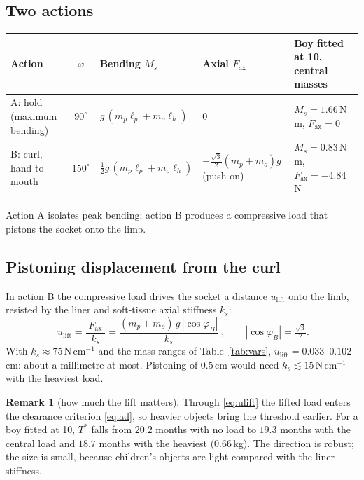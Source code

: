 \documentclass[11pt]{article}
\newcommand{\lift}{u_{\mathrm{lift}}}
\newcommand{\Fax}{F_{\mathrm{ax}}}
\theoremstyle{definition}
\newtheorem{remark}{Remark}
\begin{document}
\subsection{Two actions}
\begin{center}
\small
\renewcommand{\arraystretch}{1.3}
\begin{tabular}{@{}L{3.0cm}cL{3.2cm}L{3.2cm}L{4.4cm}@{}}
\toprule
Action & $\varphi$ & Bending $M_s$ & Axial $\Fax$ & Boy fitted at 10, central masses\\
\midrule
A: hold (maximum bending) & $90^\circ$ & $g\,(m_p\ell_p+m_o\ell_h)$ & $0$ & $M_s=1.66$\,N\,m, $\Fax=0$\\
B: curl, hand to mouth & $150^\circ$ & $\tfrac12 g\,(m_p\ell_p+m_o\ell_h)$ & $-\tfrac{\sqrt3}{2}(m_p+m_o)g$ (push-on) & $M_s=0.83$\,N\,m, $\Fax=-4.84$\,N\\
\bottomrule
\end{tabular}
\end{center}
Action A isolates peak bending; action B produces a compressive load that pistons the socket onto the limb.

\subsection{Pistoning displacement from the curl}
In action B the compressive load drives the socket a distance $\lift$ onto the limb, resisted by the liner and soft-tissue axial stiffness $k_s$:
\begin{equation}
\boxed{\;\lift=\frac{|\Fax|}{k_s}
=\frac{(m_p+m_o)\,g\,|\cos\varphi_B|}{k_s}\;},
\qquad
|\cos\varphi_B|=\tfrac{\sqrt3}{2}.
\label{eq:ulift}
\end{equation}
With $k_s\approx75$\,N\,cm$^{-1}$ \cite{gholizadeh2011} and the mass ranges of Table~\ref{tab:vars}, $\lift=0.033$--$0.102$\,cm: about a millimetre at most. Pistoning of $0.5$\,cm would need $k_s\lesssim15$\,N\,cm$^{-1}$ with the heaviest load.

\begin{remark}[how much the lift matters]\label{rem:lift}
Through \eqref{eq:ulift} the lifted load enters the clearance criterion \eqref{eq:ad}, so heavier objects bring the threshold earlier. For a boy fitted at 10, $T^*$ falls from $20.2$ months with no load to $19.3$ months with the central load and $18.7$ months with the heaviest ($0.66$\,kg). The direction is robust; the size is small, because children's objects are light compared with the liner stiffness.
\end{remark}
\end{document}
